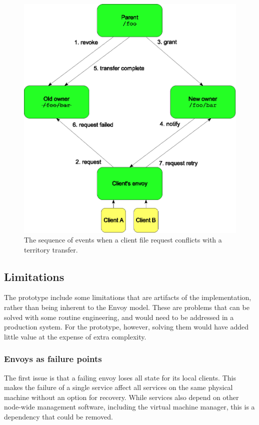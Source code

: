 \begin{figure}[tp]
\centering
\includegraphics[width=.8\textwidth]{figures/migrate-sync}
\caption[Sequence of events in a territory migration]{The sequence of events when a client file request conflicts with a territory transfer.}
\label{fig:migrate-sync}
\end{figure}

\subsection{Limitations}

The prototype include some limitations that are artifacts of the implementation, rather than being inherent to the Envoy model. These are problems that can be solved with some routine engineering, and would need to be addressed in a production system. For the prototype, however, solving them would have added little value at the expense of extra complexity.

\subsubsection{Envoys as failure points}

The first issue is that a failing envoy loses all state for its local clients. This makes the failure of a single service affect all services on the same physical machine without an option for recovery. While services also depend on other node-wide management software, including the virtual machine manager, this is a dependency that could be removed.


